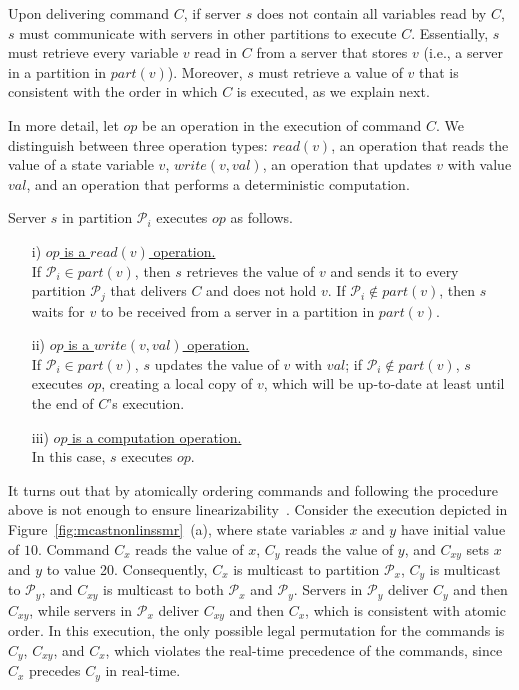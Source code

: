 \documentclass[11pt]{article}
\newcommand{\ppm}{\mathcal{P}}
\begin{document}
Upon delivering command $C$, if server $s$ does not contain all variables read by $C$, $s$ must communicate with servers in other partitions to execute $C$.
Essentially, $s$ must retrieve every variable $v$ read in $C$ from a server that stores $v$ (i.e., a server in a partition in $part(v)$).
Moreover, $s$ must retrieve a value of $v$ that is consistent with the order in which $C$ is executed, as we explain next.

In more detail, let $op$ be an operation in the execution of command $C$.
We distinguish between three operation types: $read(v)$, an operation that reads the value of a state variable $v$, $write(v, val)$, an operation that updates $v$ with value $val$,
and an operation that performs a deterministic computation.

Server $s$ in partition $\ppm_i$ executes $op$ as follows.

\begin{itemize}

\item[i)] \underline{$op$ is a $read(v)$ operation.} \\
If $\ppm_i \in part(v)$, then $s$ retrieves the value of $v$ and sends it to every partition $\ppm_j$ that delivers $C$ and does not hold $v$. If $\ppm_i \not\in part(v)$, then $s$ waits for $v$ to be received from a server in a partition in $part(v)$.

\item[ii)] \underline{$op$ is a $write(v,val)$ operation.} \\
If $\ppm_i \in part(v)$, $s$ updates the value of $v$ with $val$; if $\ppm_i \not\in part(v)$, $s$ executes $op$, creating a local copy of $v$, which will be up-to-date at least until the end of $C$'s execution.

\item[iii)] \underline{$op$ is a computation operation.}\\
In this case, $s$ executes $op$.

\end{itemize}


It turns out that by atomically ordering commands and following the procedure above is not enough to ensure linearizability~\cite{bezerra2014ssmr}.
Consider the execution depicted in Figure~\ref{fig:mcastnonlinssmr}~(a), where state variables $x$ and $y$ have initial value of $10$.
Command $C_x$ reads the value of $x$, $C_y$ reads the value of $y$, and $C_{xy}$ sets $x$ and $y$ to value 20.
Consequently, $C_x$ is multicast to partition $\ppm_x$, $C_y$ is multicast to $\ppm_y$, and $C_{xy}$ is multicast to both $\ppm_x$ and $\ppm_y$.
Servers in $\ppm_y$ deliver $C_y$ and then $C_{xy}$, while servers in $\ppm_x$ deliver $C_{xy}$ and then $C_x$, which is consistent with atomic order.
In this execution, the only possible legal permutation for the commands is $C_y$, $C_{xy}$, and $C_x$, which violates the real-time precedence of the commands, since $C_x$ precedes $C_y$ in real-time.
\end{document}
